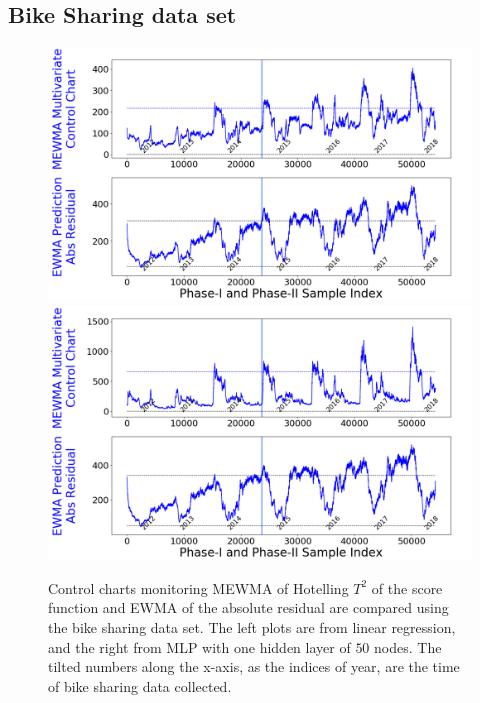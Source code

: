 \documentclass[twoside,11pt]{article}
\begin{document}
\subsection{Bike Sharing data set}
\label{ss:bs_ds}
\begin{figure}[!htbp]
\centering
\includegraphics[width = 0.49\linewidth]{../figures/v14/bike_sharing/reg_scal_train/bike_reg_1e-08_0_0001_0_005_99_0.png}
\includegraphics[width = 0.49\linewidth]{../figures/v14/bike_sharing/reg_nnet_scal_train/bike_reg_0_1_0_0001_0_005_99_0.png}
  \caption{
Control charts monitoring MEWMA of Hotelling $T^2$ of the score function and EWMA of the absolute residual are compared using the bike sharing data set. The left plots are from linear regression, and the right from MLP with one hidden layer of $50$ nodes. The tilted numbers along the x-axis, as the indices of year, are the time of bike sharing data collected.
}
\end{figure}
\end{document}

